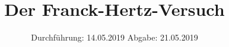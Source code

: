 

\subject{V601}
\title{Der Franck-Hertz-Versuch}
\date{
  Durchführung: 14.05.2019
  \hspace{3em}
  Abgabe: 21.05.2019
}


\maketitle
\thispagestyle{empty}
\tableofcontents
\newpage

%


%




\printbibliography

